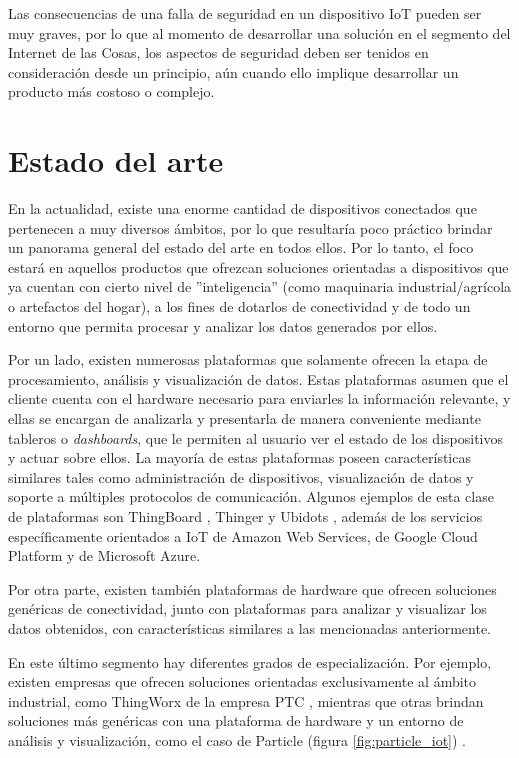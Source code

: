 Las consecuencias de una falla de seguridad en un dispositivo IoT pueden ser muy graves, por lo que al momento de desarrollar una solución en el segmento del Internet de las Cosas, los aspectos de seguridad deben ser tenidos en consideración desde un principio, aún cuando ello implique desarrollar un producto más costoso o complejo.

\section{Estado del arte{}}
\label{sec:estado_del_arte}

En la actualidad, existe una enorme cantidad de dispositivos conectados que pertenecen a muy diversos ámbitos, por lo que resultaría poco práctico brindar un panorama general del estado del arte en todos ellos. Por lo tanto, el foco estará en aquellos productos que ofrezcan soluciones orientadas a dispositivos que ya cuentan con cierto nivel de ''inteligencia'' (como maquinaria industrial/agrícola o artefactos del hogar), a los fines de dotarlos de conectividad y de todo un entorno que permita procesar y analizar los datos generados por ellos.

Por un lado, existen numerosas plataformas que solamente ofrecen la etapa de procesamiento, análisis y visualización de datos. Estas plataformas asumen que el cliente cuenta con el hardware necesario para enviarles la información relevante, y ellas se encargan de analizarla y presentarla de manera conveniente mediante tableros o \emph{dashboards}, que le permiten al usuario ver el estado de los dispositivos y actuar sobre ellos. La mayoría de estas plataformas poseen características similares tales como administración de dispositivos, visualización de datos y soporte a múltiples protocolos de comunicación. Algunos ejemplos de esta clase de plataformas son ThingBoard \citep{7}, Thinger \citep{8} y Ubidots \citep{9}, además de los servicios específicamente orientados a IoT de Amazon Web Services, de Google Cloud Platform y de Microsoft Azure.  

Por otra parte, existen también plataformas de hardware que ofrecen soluciones genéricas de conectividad, junto con plataformas para analizar y visualizar los datos obtenidos, con características similares a las mencionadas anteriormente.

En este último segmento hay diferentes grados de especialización. Por ejemplo, existen empresas que ofrecen soluciones orientadas exclusivamente al ámbito industrial, como ThingWorx de la empresa PTC \citep{10}, mientras que otras brindan soluciones más genéricas con una plataforma de hardware y un entorno de análisis y visualización, como el caso de Particle (figura \ref{fig:particle_iot}) \citep{11}.


